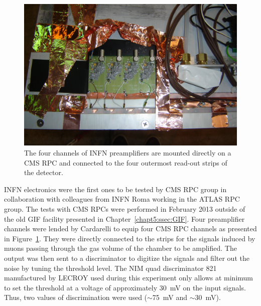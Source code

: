 \begingroup\setlength{\intextsep}{5pt}\setlength{\columnsep}{15pt}
	
	\begin{figure}
		\centering
		\includegraphics[width=\linewidth]{fig/chapt6/INFN-Preamp-2013.JPG}
		\caption{\label{fig:INFN-preamp} The four channels of INFN preamplifiers are mounted directly on a CMS RPC and connected to the four outermost read-out strips of the detector.}
	\end{figure}
	
	INFN electronics were the first ones to be tested by CMS RPC group in collaboration with colleagues from INFN Roma working in the ATLAS RPC group. The tests with CMS RPCs were performed in February 2013 outside of the old GIF facility presented in Chapter~\ref{chapt5:ssec:GIF}. Four preamplifier channels were lended by Cardarelli to equip four CMS RPC channels as presented in Figure~\ref{fig:INFN-preamp}. They were directly connected to the strips for the signals induced by muons passing through the gas volume of the chamber to be amplified. The output was then sent to a discriminator to digitize the signals and filter out the noise by tuning the threshold level. The NIM quad discriminator 821 manufactured by LECROY used during this experiment only allows at minimum to set the threshold at a voltage of approximately \SI{30}{mV} on the input signals. Thus, two values of discrimination were used ($\sim$\SI{75}{mV} and $\sim$\SI{30}{mV}).
	
\endgroup
	 
